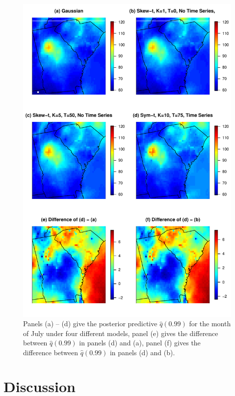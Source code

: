 \begin{figure}
  \centering
  \includegraphics[height=0.95\textheight]{plots/q99-ozone.pdf}
  \caption{Panels (a) -- (d) give the posterior predictive $\widehat{q}(0.99)$ for the month of July under four different models, panel (e) gives the difference between $\widehat{q}(0.99)$ in panels (d) and (a), panel (f) gives the difference between $\widehat{q}(0.99)$ in panels (d) and (b).}
  \label{stfig:ozoneq99}
\end{figure}

\section{Discussion}\label{sts:con}

